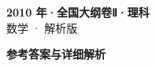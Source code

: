 \documentclass[zihao=-4, a4paper]{ctexart}
\begin{document}
\begin{center}
  {\Large\bfseries 2010 年·全国大纲卷Ⅱ·理科}\\[4pt]
  {\large 数学 · 解析版}
\end{center}
\medskip
{}

\clearpage
{}
\begin{center}{\Large\bfseries 参考答案与详细解析}\end{center}
\medskip

\end{document}
